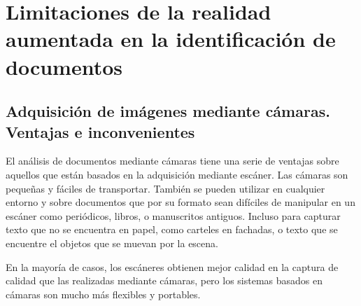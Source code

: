\section{Limitaciones de la realidad aumentada en la identificación de documentos}
\subsection{Adquisición de imágenes mediante cámaras. Ventajas e inconvenientes}
El análisis de documentos mediante cámaras tiene una serie de ventajas sobre aquellos que están basados en la adquisición mediante escáner. Las cámaras son pequeñas y fáciles de transportar. También se pueden utilizar en cualquier entorno y sobre documentos que por su formato sean difíciles de manipular en un escáner como periódicos, libros, o manuscritos antiguos. Incluso para capturar texto que no se encuentra en papel, como carteles en fachadas, o texto que se encuentre el objetos que se muevan por la escena.

En la mayoría de casos, los escáneres obtienen mejor calidad en la captura de calidad que las realizadas mediante cámaras, pero los sistemas basados en cámaras son mucho más flexibles y portables. 

